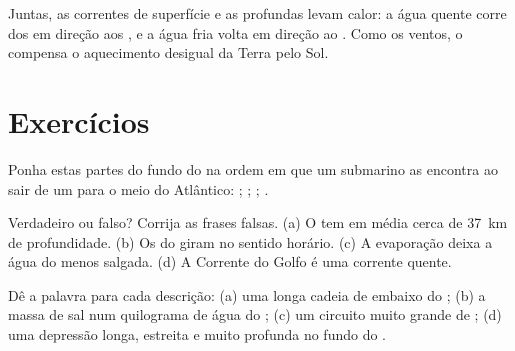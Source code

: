 Juntas, as correntes de superfície e as profundas levam calor: a água
quente corre dos  em direção aos , e a água fria volta em
direção ao . Como os ventos, o  compensa o aquecimento
desigual da Terra pelo Sol.

\section{Exercícios}

\begin{exercise}[$\star$]\label{exo:g8:the-oceans:1}
Ponha estas partes do fundo do  na ordem em que um submarino as
encontra ao sair de um  para o meio do Atlântico: ; ; ; .
\end{exercise}

\begin{exercise}[$\star$]\label{exo:g8:the-oceans:2}
Verdadeiro ou falso? Corrija as frases falsas. (a) O  tem em média
cerca de \qty{37}{km} de profundidade. (b) Os  do 
giram no sentido horário. (c) A evaporação deixa a água do  menos
salgada. (d) A Corrente do Golfo é uma corrente quente.
\end{exercise}

\begin{exercise}[$\star$]\label{exo:g8:the-oceans:3}
Dê a palavra para cada descrição: (a) uma longa cadeia de 
embaixo do ; (b) a massa de sal num quilograma de água do ; (c) um
circuito muito grande de ; (d) uma depressão longa,
estreita e muito profunda no fundo do .
\end{exercise}

